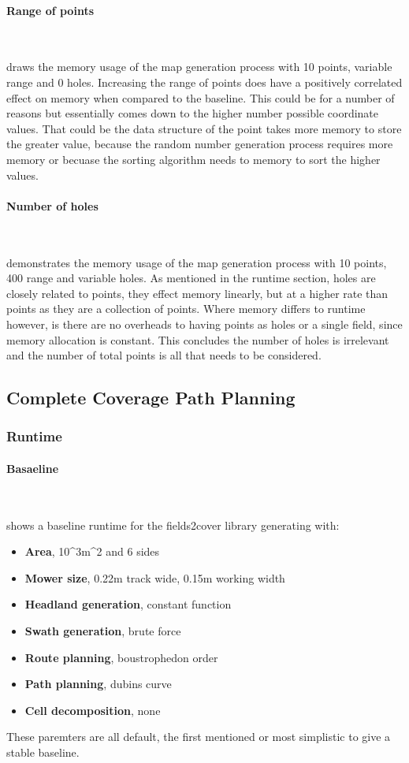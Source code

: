 \documentclass[final]{cmpreport_02}
\begin{document}
\paragraph{Range of points} \

 draws the memory usage of the map generation process with 10 points, variable range and 0 holes.
Increasing the range of points does have a positively correlated effect on memory when compared to the baseline.
This could be for a number of reasons but essentially comes down to the higher number possible coordinate values.
That could be the data structure of the point takes more memory to store the greater value, because the random number generation process requires more memory or becuase the sorting algorithm needs to memory to sort the higher values.

\paragraph{Number of holes} \

 demonstrates the memory usage of the map generation process with 10 points, 400 range and variable holes.
As mentioned in the runtime section, holes are closely related to points, they effect memory linearly, but at a higher rate than points as they are a collection of points.
Where memory differs to runtime however, is there are no overheads to having points as holes or a single field, since memory allocation is constant.
This concludes the number of holes is irrelevant and the number of total points is all that needs to be considered.


\subsection{Complete Coverage Path Planning}
\subsubsection{Runtime}
\paragraph{Basaeline} \

 shows a baseline runtime for the fields2cover library generating with:

\begin{itemize}
    \item{\textbf{Area}, 10^3m^2 and 6 sides}
    \item{\textbf{Mower size}, 0.22m track wide, 0.15m working width}
    \item{\textbf{Headland generation}, constant function}
    \item{\textbf{Swath generation}, brute force}
    \item{\textbf{Route planning}, boustrophedon order}
    \item{\textbf{Path planning}, dubins curve}
    \item{\textbf{Cell decomposition}, none}
\end{itemize}
These paremters are all default, the first mentioned or most simplistic to give a stable baseline.
\end{document}
